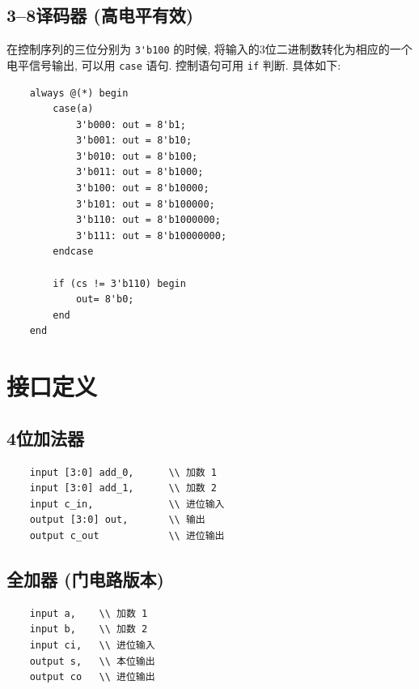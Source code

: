 \documentclass{article}
\begin{document}
\subsection{3--8译码器 (高电平有效)}

在控制序列的三位分别为 \lstinline|3'b100| 的时候, 将输入的3位二进制数转化为相应的一个电平信号输出, 可以用 \lstinline|case| 语句. 控制语句可用 \lstinline|if| 判断. 具体如下:
\begin{lstlisting}
    always @(*) begin
        case(a)
            3'b000: out = 8'b1;
            3'b001: out = 8'b10;
            3'b010: out = 8'b100;
            3'b011: out = 8'b1000;
            3'b100: out = 8'b10000;
            3'b101: out = 8'b100000;
            3'b110: out = 8'b1000000;
            3'b111: out = 8'b10000000;
        endcase
        
        if (cs != 3'b110) begin
            out= 8'b0;
        end
    end
\end{lstlisting}

\section{接口定义}

\subsection{4位加法器}

\begin{lstlisting}
    input [3:0] add_0,      \\ 加数 1
    input [3:0] add_1,      \\ 加数 2
    input c_in,             \\ 进位输入
    output [3:0] out,       \\ 输出
    output c_out            \\ 进位输出
\end{lstlisting}

\subsection{全加器 (门电路版本)}

\begin{lstlisting}
    input a,    \\ 加数 1
    input b,    \\ 加数 2
    input ci,   \\ 进位输入
    output s,   \\ 本位输出
    output co   \\ 进位输出
\end{lstlisting}
\end{document}
